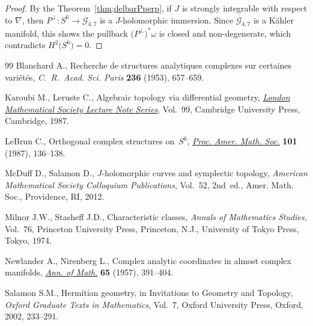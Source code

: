 \documentclass[11pt]{article}
\numberwithin{equation}{section}
\newcommand{\cG}{{\mathcal G}}
\begin{document}
\begin{proof} By the Theorem~\ref{thm;delbarPperp}, if $J$ is strongly integrable with respect to $\nabla$, then $P^\perp\colon S^6 \to \cG_{4,7}$ is a $J$-holomorphic immersion. Since $\cG_{4,7}$ is a K\"ahler manifold, this shows the pullback $\big(P^\perp \big)^*\omega$ is closed and non-degenerate, which contradicts $H^2\big(S^6\big) =0$.
\end{proof}
\begin{thebibliography}{99}
Blanchard A., Recherche de structures analytiques complexes sur certaines
 vari\'et\'es, \textit{C.~R.~Acad. Sci. Paris} \textbf{236} (1953), 657--659.

Karoubi M., Leruste C., Algebraic topology via differential geometry,
 \href{https://doi.org/10.1017/CBO9780511629372}{\textit{London Mathematical Society Lecture Note Series}}, Vol.~99, Cambridge
 University Press, Cambridge, 1987.

LeBrun C., Orthogonal complex structures on~{$S^6$}, \href{https://doi.org/10.2307/2046564}{\textit{Proc. Amer. Math.
 Soc.}} \textbf{101} (1987), 136--138.

McDuff D., Salamon D., {$J$}-holomorphic curves and symplectic topology,
 \textit{American Mathematical Society Colloquium Publications}, Vol.~52, 2nd~ed., Amer. Math. Soc., Providence, RI, 2012.

Milnor J.W., Stasheff J.D., Characteristic classes, \textit{Annals of
 Mathematics Studies}, Vol.~76, Princeton University Press, Princeton, N.J.,
 University of Tokyo Press, Tokyo, 1974.

Newlander A., Nirenberg L., Complex analytic coordinates in almost complex
 manifolds, \href{https://doi.org/10.2307/1970051}{\textit{Ann. of Math.}} \textbf{65} (1957), 391--404.

Salamon S.M., Hermitian geometry, in Invitations to Geometry and Topology,
 \textit{Oxford Graduate Texts in Mathematics}, Vol.~7, Oxford University
 Press, Oxford, 2002, 233--291.

\end{thebibliography}
\end{document}
